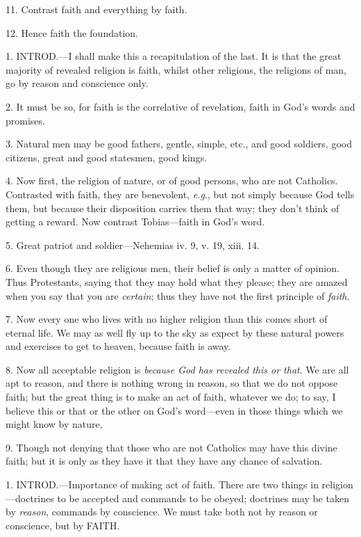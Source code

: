 11. Contrast faith and everything by faith.

12. Hence faith the foundation.


1. INTROD.—I
shall make this a recapitulation of the last. It is that the great
majority of revealed religion is faith, whilst other religions, the
religions of man, go by reason and conscience only.

2. It must be so, for faith is the correlative of
revelation, faith in God's words and promises.

3. Natural men may be good fathers, gentle,
simple, etc., and good soldiers, good citizens, great and good
statesmen, good kings.

4. Now first, the religion of nature, or of good
persons, who are not Catholics. Contrasted with faith, they are
benevolent, \emph{e.g}., but not simply because God tells them, but
because their disposition carries them that way; they don't think of
getting a reward. Now contrast Tobias—faith in God's word.

5. Great patriot and soldier—Nehemias iv. 9, v.
19, xiii. 14.

6. Even though they are religious men, their
belief is only a matter of opinion. Thus Protestants, saying that they
may hold what they please; they are amazed when you say that you are \emph{certain};
thus they have not the first principle of \emph{faith}.

7. Now every one who lives with no higher
religion than this comes short of eternal life. We may as well fly up
to the sky as expect by these natural powers and exercises to get to
heaven, because faith is away.

8. Now all acceptable religion is \emph{because God
has revealed this or that}. We are all apt to reason, and there is
nothing wrong in reason, so that we do not oppose faith; but the great
thing is to make an act of faith, whatever we do; to say, I believe
this or that or the other on God's word—even in those things which
we might know by nature,

9. Though not denying that those who are not
Catholics may have this divine faith; but it is only as they have it
that they have any chance of salvation.


1. INTROD.—Importance
of making act of faith. There are two things in religion—doctrines
to be accepted and commands to be obeyed; doctrines may be taken
by \emph{reason}, commands by conscience. We must take both not by
reason or conscience, but by FAITH.

